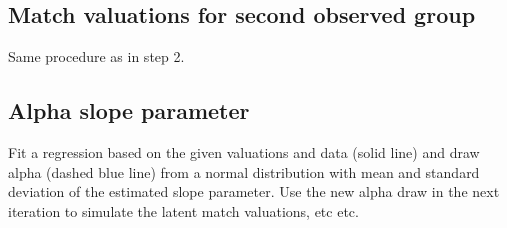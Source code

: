 \subsection{Match valuations for second observed group}

Same procedure as in step 2.


\subsection{Alpha slope parameter}

Fit a regression based on the given valuations and data (solid line) and draw alpha (dashed blue line) from a normal distribution with mean and standard deviation of the estimated slope parameter.
Use the new alpha draw in the next iteration to simulate the latent match valuations, etc etc.

\clearpage

